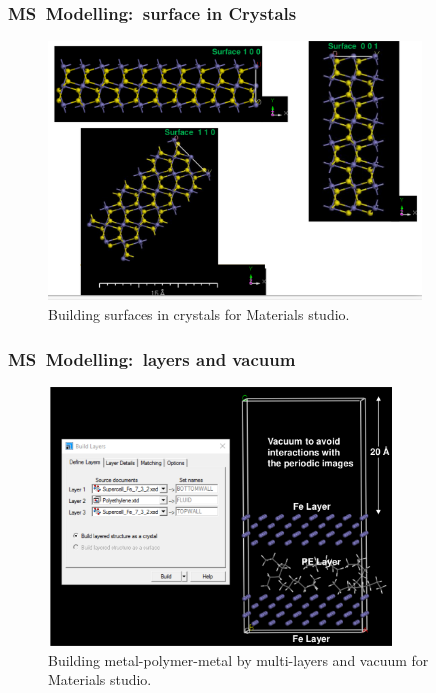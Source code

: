 \frame
{
	\frametitle{\textrm{MS~Modelling:~surface in Crystals}}
\begin{figure}[h!]
\centering
\vspace*{-0.18in}
\includegraphics[height=2.70in,width=3.90in,viewport=0 0 1064 737,clip]{Figures/MS-Building_Surface.png}
\caption{\tiny \textrm{Building surfaces in crystals for Materials studio.}}%
\label{MS-Building_Surface}
\end{figure}
}

\frame
{
	\frametitle{\textrm{MS~Modelling:~layers and vacuum}}
\begin{figure}[h!]
\centering
\vspace*{-0.18in}
\includegraphics[height=2.70in,width=3.60in,viewport=0 0 1006 763,clip]{Figures/MS-Building_layer.png}
\caption{\tiny \textrm{Building metal-polymer-metal by multi-layers and vacuum for Materials studio.}}%
\label{MS-Building_layer}
\end{figure}
}

